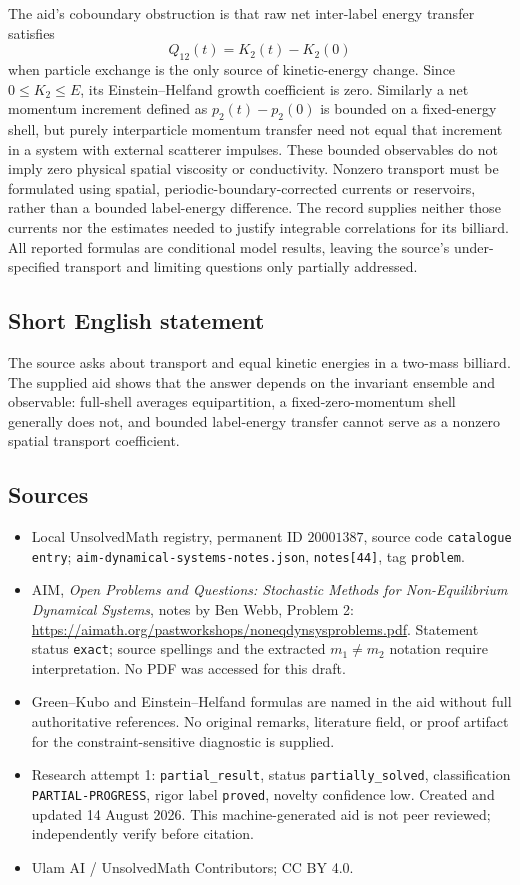 \documentclass[11pt]{article}
\begin{document}
The aid's coboundary obstruction is that raw net inter-label energy transfer satisfies
\[
 Q_{12}(t)=K_2(t)-K_2(0)
\]
when particle exchange is the only source of kinetic-energy change. Since \(0\le K_2\le E\), its Einstein--Helfand growth coefficient is zero. Similarly a net momentum increment defined as \(p_2(t)-p_2(0)\) is bounded on a fixed-energy shell, but purely interparticle momentum transfer need not equal that increment in a system with external scatterer impulses. These bounded observables do not imply zero physical spatial viscosity or conductivity. Nonzero transport must be formulated using spatial, periodic-boundary-corrected currents or reservoirs, rather than a bounded label-energy difference. The record supplies neither those currents nor the estimates needed to justify integrable correlations for its billiard. All reported formulas are conditional model results, leaving the source's under-specified transport and limiting questions only partially addressed.
\subsection{Short English statement}
The source asks about transport and equal kinetic energies in a two-mass billiard. The supplied aid shows that the answer depends on the invariant ensemble and observable: full-shell averages equipartition, a fixed-zero-momentum shell generally does not, and bounded label-energy transfer cannot serve as a nonzero spatial transport coefficient.
\subsection{Sources}
\begin{itemize}
\item Local UnsolvedMath registry, permanent ID \(20001387\), source code \texttt{catalogue entry}; \texttt{aim-dynamical-systems-notes.json}, \texttt{notes[44]}, tag \texttt{problem}.
\item AIM, \emph{Open Problems and Questions: Stochastic Methods for Non-Equilibrium Dynamical Systems}, notes by Ben Webb, Problem 2: \url{https://aimath.org/pastworkshops/noneqdynsysproblems.pdf}. Statement status \texttt{exact}; source spellings and the extracted \(m_1\ne m_2\) notation require interpretation. No PDF was accessed for this draft.
\item Green--Kubo and Einstein--Helfand formulas are named in the aid without full authoritative references. No original remarks, literature field, or proof artifact for the constraint-sensitive diagnostic is supplied.
\item Research attempt 1: \texttt{partial\_result}, status \texttt{partially\_solved}, classification \texttt{PARTIAL-PROGRESS}, rigor label \texttt{proved}, novelty confidence low. Created and updated 14 August 2026. This machine-generated aid is not peer reviewed; independently verify before citation.
\item Ulam AI / UnsolvedMath Contributors; CC BY 4.0.
\end{itemize}
\end{document}
